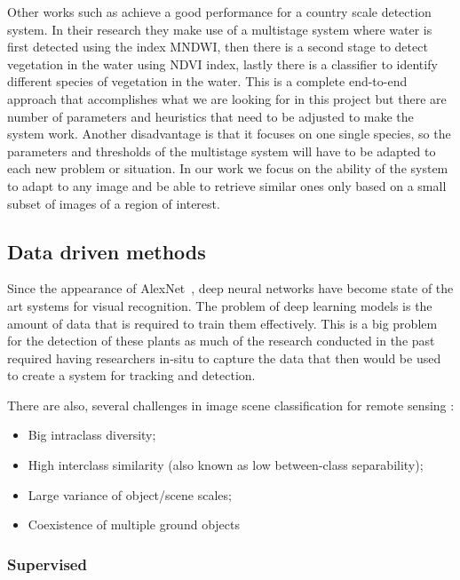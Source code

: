 \documentclass[conference]{IEEEtran}
\begin{document}
    Other works such as \citet{rs12244021} achieve a good performance for a country scale detection system.
    In their research they make use of a multistage system where water is first detected using the index MNDWI, then there is a second stage to detect vegetation in the water using NDVI index, lastly there is a classifier to
    identify different species of vegetation in the water.
    This is a complete end-to-end approach that accomplishes what we are looking for in this project but there are number of parameters and heuristics that need to be adjusted to make the system work.
    Another disadvantage is that it focuses on one single species, so the parameters and thresholds of the multistage system will have to be adapted to each new problem or situation.
    In our work we focus on the ability of the system to adapt to any image and be able to retrieve similar ones only based on a small subset of images of a region of interest.


    \subsection*{Data driven methods}
    Since the appearance of AlexNet~\cite{NIPS2012_c399862d}, deep neural networks have become state of the art systems for visual recognition.
    The problem of deep learning models is the amount of data that is required to train them effectively.
    This is a big problem for the detection of these plants as much of the research conducted in the past required having researchers in-situ to capture the data that then
    would be used to create a system for tracking and detection.

    There are also, several challenges in image scene classification for remote sensing \cite{9127795}:
    \begin{itemize}
        \item Big intraclass diversity;
        \item High interclass similarity (also known as low between-class separability);
        \item Large variance of object/scene scales;
        \item Coexistence of multiple ground objects
    \end{itemize}

    \subsubsection{Supervised}
\end{document}

